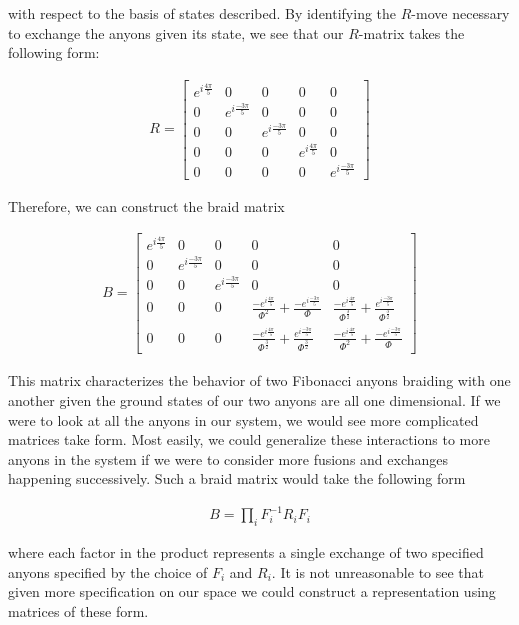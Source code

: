 with respect to the basis of states described. By identifying the $R$-move necessary to exchange the anyons given its state, we see that our $R$-matrix takes the following form:

\begin{equation}
	\begin{aligned}
		R = \begin{bmatrix}
				e^{i\frac{4\pi}{5}} & 0 & 0 & 0 & 0 \\
				0 & e^{i\frac{-3\pi}{5}} & 0 & 0 & 0 \\
				0 & 0 & e^{i\frac{-3\pi}{5}} & 0 & 0 \\
				0 & 0 & 0 & e^{i\frac{4\pi}{5}} & 0\\
				0 & 0 & 0 & 0 &e^{i\frac{-3\pi}{5}} 
			\end{bmatrix}
	\end{aligned}
\end{equation}

Therefore, we can construct the braid matrix

\begin{equation}
	\begin{aligned}
		B = \begin{bmatrix}
				e^{i\frac{4\pi}{5}} & 0 & 0 & 0 & 0 \\
				0 & e^{i\frac{-3\pi}{5}} & 0 & 0 & 0 \\
				0 & 0 & e^{i\frac{-3\pi}{5}} & 0 & 0 \\
				0 & 0 & 0 & \frac{-e^{i\frac{4\pi}{5}}}{\Phi^2} + \frac{-e^{i\frac{-3\pi}{5}}}{\Phi}& \frac{-e^{i\frac{4\pi}{5}}}{\Phi^\frac{3}{2}} + \frac{e^{i\frac{-3\pi}{5}}}{\Phi^\frac{3}{2}}\\
				0 & 0 & 0&\frac{-e^{i\frac{4\pi}{5}}}{\Phi^\frac{3}{2}} + \frac{e^{i\frac{-3\pi}{5}}}{\Phi^\frac{3}{2}} &\frac{-e^{i\frac{4\pi}{5}}}{\Phi^2} + \frac{-e^{i\frac{-3\pi}{5}}}{\Phi}
			\end{bmatrix}
	\end{aligned}
\end{equation}

This matrix characterizes the behavior of two Fibonacci anyons braiding with one another given the ground states of our two anyons are all one dimensional. If we were to look at all the anyons in our system, we would see more complicated matrices take form. Most easily, we could generalize these interactions to more anyons in the system if we were to consider more fusions and exchanges happening successively. Such a braid matrix would take the following form

\begin{equation}
	\begin{aligned}
		B = \prod_i F_i^{-1}R_iF_i
	\end{aligned}
\end{equation}

where each factor in the product represents a single exchange of two specified anyons specified by the choice of $F_i$ and $R_i$. It is not unreasonable to see that given more specification on our space we could construct a representation using matrices of these form.